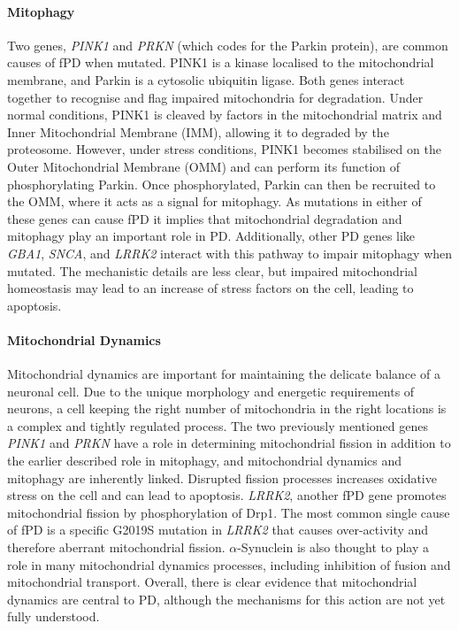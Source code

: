 \documentclass{article}
\begin{document}
\paragraph{Mitophagy}Two genes, \textit{PINK1} and \textit{PRKN} (which codes for the Parkin protein), are common causes of fPD when mutated\cite{Malpartida2021MitochondrialTherapy}. PINK1 is a kinase localised to the mitochondrial membrane\cite{Narendra2010PINK1Parkin}, and Parkin is a cytosolic ubiquitin ligase\cite{Narendra2008ParkinAutophagy}. Both genes interact together to recognise and flag impaired mitochondria for degradation. Under normal conditions, PINK1 is cleaved by factors in the mitochondrial matrix and Inner Mitochondrial Membrane (IMM), allowing it to degraded by the proteosome\cite{Pickles2018MitophagyMaintenance}. However, under stress conditions, PINK1 becomes stabilised on the Outer Mitochondrial Membrane (OMM) and can perform its function of phosphorylating Parkin. Once phosphorylated, Parkin can then be recruited to the OMM, where it acts as a signal for mitophagy. As mutations in either of these genes can cause fPD it implies that mitochondrial degradation and mitophagy play an important role in PD. Additionally, other PD genes like \textit{GBA1}, \textit{SNCA}, and \textit{LRRK2} interact with this pathway to impair mitophagy when mutated\cite{Malpartida2021MitochondrialTherapy}. The mechanistic details are less clear, but impaired mitochondrial homeostasis may lead to an increase of stress factors on the cell, leading to apoptosis\cite{Eldeeb2022MitochondrialDisease}.
\paragraph{Mitochondrial Dynamics}Mitochondrial dynamics are important for maintaining the delicate balance of a neuronal cell\cite{Chen2009MitochondrialDiseases}. Due to the unique morphology and energetic requirements of neurons, a cell keeping the right number of mitochondria in the right locations is a complex and tightly regulated process. The two previously mentioned genes \textit{PINK1} and \textit{PRKN} have a role in determining mitochondrial fission in addition to the earlier described role in mitophagy, and mitochondrial dynamics and mitophagy are inherently linked\cite{Archer2013MitochondrialDiseases}. Disrupted fission processes increases oxidative stress on the cell and can lead to apoptosis. \textit{LRRK2}, another fPD gene promotes mitochondrial fission by phosphorylation of Drp1. The most common single cause of fPD is a specific G2019S mutation in \textit{LRRK2} that causes over-activity and therefore aberrant mitochondrial fission\cite{Su2013InhibitionMutation}. $\alpha$-Synuclein is also thought to play a role in many mitochondrial dynamics processes, including inhibition of fusion and mitochondrial transport\cite{Valdinocci2019IntracellularDisease}. Overall, there is clear evidence that mitochondrial dynamics are central to PD, although the mechanisms for this action are not yet fully understood.
\end{document}
